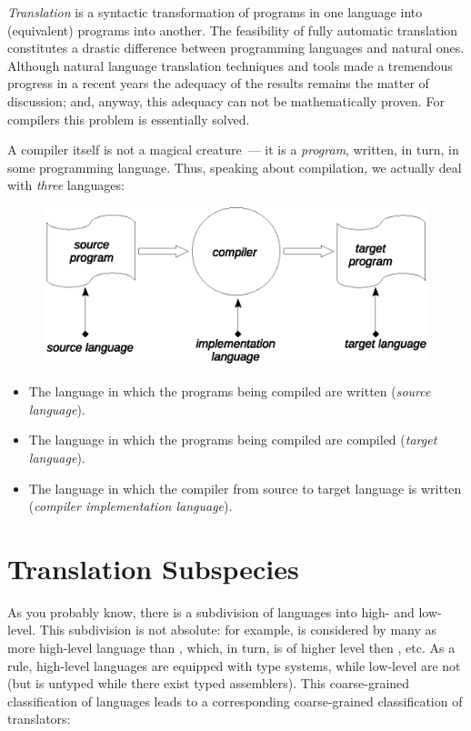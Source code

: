 \emph{Translation} is a syntactic transformation of programs in one language into (equivalent) programs into another.
The feasibility of fully automatic translation constitutes a drastic difference between programming languages and natural ones.
Although natural language translation techniques and tools made a tremendous progress in a recent years the adequacy of the results
remains the matter of discussion; and, anyway, this adequacy can not be mathematically proven. For compilers this problem
is essentially solved.

A compiler itself is not a magical creature~--- it is a \emph{program}, written, in turn, in some programming language. Thus, speaking
about compilation, we actually deal with \emph{three} languages:

\begin{figure}[h]
  \centering
  \includegraphics[scale=0.7]{images/01-04.eps}
\end{figure}

\begin{itemize}
\item The language in which the programs being compiled are written (\emph{source language}).
\item The language in which the programs being compiled are compiled (\emph{target language}).
\item The language in which the compiler from source to target language is written (\emph{compiler implementation language}).
\end{itemize}

\section{Translation Subspecies}

As you probably know, there is a subdivision of languages into high- and low-level. This subdivision is not absolute: for example,
 is considered by many as more high-level language than , which, in turn, is of higher level then , etc.
As a rule, high-level languages are equipped with type systems, while low-level are not (but  is untyped while there
exist typed assemblers). This coarse-grained classification of languages leads to a corresponding coarse-grained classification of
translators:

